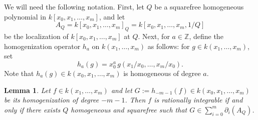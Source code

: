\documentclass{amsart}
\newtheorem{lem}[thm]{Lemma}
\theoremstyle{definition}
\numberwithin{equation}{section}
\numberwithin{thm}{section}
\begin{document}
We will need the following notation.  First, let $Q$ be a squarefree homogeneous polynomial in $k[x_0,x_1,\dots,x_m]$, and let 
\[
A_Q = k[x_0,x_1,\dots,x_m]_Q = k[x_0,x_1,\dots,x_m,1/Q]
\]
be the localization of $k[x_0,x_1,\dots,x_m]$ at $Q$.  Next, for $a \in \mathbb{Z}$, 
define the homogenization operator $h_a$ on $k(x_1,\dots,x_m)$ as follows: for $g \in k(x_1,\dots,x_m)$, set
\[
h_a(g) = x_0^{a} \, g(x_1/x_0,\dots,x_m/x_0).
\]
Note that $h_a(g)  \in k(x_0,x_1,\dots,x_m)$ is homogeneous of degree $a$.  

\begin{lem}
\label{LEM:HomogeneousPicard}
Let $f \in k(x_1,\dots,x_m)$ and let $G := h_{-m-1}(f) \in k(x_0,x_1,\dots,x_m)$ be its homogenization of degree $-m-1$.  Then 
$f$ is rationally integrable if and only if there exists $Q$ homogeneous and squarefree such that $G \in \sum_{i=0}^m \partial_i(A_Q)$.
\end{lem}
\end{document}
